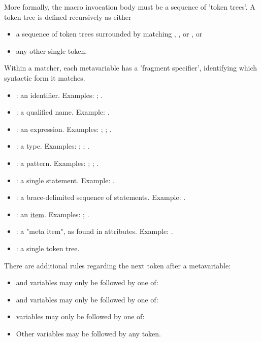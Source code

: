 \blank

More formally, the macro invocation body must be a sequence of 'token trees'. A token tree is defined recursively as either

\begin{itemize}
  \item{a sequence of token trees surrounded by matching \code{()}, \code{[]}, or \code{\{\}}, or}
  \item{any other single token.}
\end{itemize}

Within a matcher, each metavariable has a 'fragment specifier', identifying which syntactic form it matches.

\begin{itemize}
  \item{: an identifier. Examples: \x; .}
  \item{: a qualified name. Example: .}
  \item{: an expression. Examples: ; ; .}
  \item{: a type. Examples: \itt; ; .}
  \item{: a pattern. Examples: ; ; \code{\_}.}
  \item{: a single statement. Example: .}
  \item{: a brace-delimited sequence of statements. Example: .}
  \item{: an \href{https://doc.rust-lang.org/reference.html\#items}{item}. Examples: ; .}
  \item{: a "meta item", as found in attributes. Example: .}
  \item{: a single token tree.}
\end{itemize}

There are additional rules regarding the next token after a metavariable:

\begin{itemize}
  \item{ and  variables may only be followed by one of: \code{=> , ;}}
  \item{ and  variables may only be followed by one of: \code{=> , = | ; : > [ \{ as where}}
  \item{ variables may only be followed by one of: }
  \item{Other variables may be followed by any token.}
\end{itemize}

